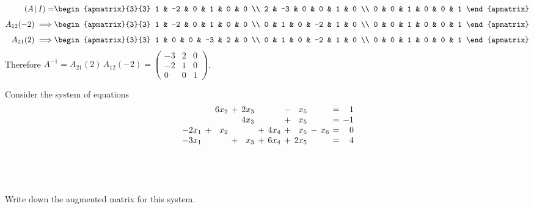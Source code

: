 \documentclass[a4paper]{article}
\begin{document}
\begin{align*}
(A\,|\,I) = &\begin{apmatrix}{3}{3}
    1 & -2 & 0 & 1 & 0 & 0 \\
    2 & -3 & 0 & 0 & 1 & 0 \\
    0 & 0 & 1 & 0 & 0 & 1
\end{apmatrix} \\[1ex]
A_{12}(-2) \implies &\begin{apmatrix}{3}{3}
    1 & -2 & 0 & 1 & 0 & 0 \\
    0 & 1 & 0 & -2 & 1 & 0 \\
    0 & 0 & 1 & 0 & 0 & 1
\end{apmatrix} \\[1ex]
A_{21}(2) \implies &\begin{apmatrix}{3}{3}
    1 & 0 & 0 & -3 & 2 & 0 \\
    0 & 1 & 0 & -2 & 1 & 0 \\
    0 & 0 & 1 & 0 & 0 & 1
\end{apmatrix}
\end{align*}
Therefore $A^{-1} = A_{21}(2)\, A_{12}(-2) = \begin{pmatrix}-3 & 2 & 0 \\ -2 & 1 & 0 \\ 0 & 0 & 1\end{pmatrix}$.


\begin{questionbody}
Consider the system of equations \[
\arraycolsep=2pt
\begin{array}{rcrcrcrcrcrcr}
      & & 6x_2 &+& 2x_3 & &      &-& x_5  & &     &=& 1 \\
      & &      & & 4x_3 & &      &+& x_5  & &     &=& -1 \\
-2x_1 &+& x_2  & &      &+& 4x_4 &+& x_5  &-& x_6 &=& 0 \\
-3x_1 & &      &+& x_3  &+& 6x_4 &+& 2x_5 & &     &=& 4
\end{array}\]
\end{questionbody}

\subsection{~} %

\begin{questionbody}
Write down the augmented matrix for this system.
\end{questionbody}
\end{document}
